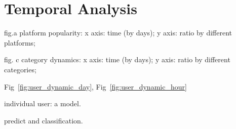 \section{Temporal Analysis}

fig.a platform popularity:  x axis: time (by days); y axis: ratio by different platforms;

fig. c category dynamics: x axis: time (by days); y axis: ratio by
different categories;

Fig~\ref{fig:user_dynamic_day}, Fig~\ref{fig:user_dynamic_hour}


individual user: a model.

predict and classification.
